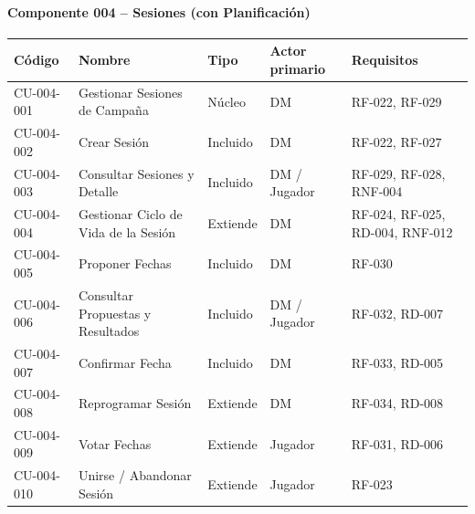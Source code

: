 \paragraph{Componente 004 -- Sesiones (con Planificación)}
{\footnotesize\setlength{\tabcolsep}{4pt}\renewcommand{\arraystretch}{1.15}
\begin{longtable}{|>{\raggedright\arraybackslash}p{1.9cm}|>{\raggedright\arraybackslash}p{4.4cm}|>{\raggedright\arraybackslash}p{1.7cm}|>{\raggedright\arraybackslash}p{2.5cm}|>{\raggedright\arraybackslash}p{4.0cm}|}
\hline
\textbf{Código} & \textbf{Nombre} & \textbf{Tipo} & \textbf{Actor primario} & \textbf{Requisitos} \\ \hline\endhead
CU-004-001 & Gestionar Sesiones de Campaña & Núcleo & DM & RF-022, RF-029 \\ \hline
CU-004-002 & Crear Sesión & Incluido & DM & RF-022, RF-027 \\ \hline
CU-004-003 & Consultar Sesiones y Detalle & Incluido & DM / Jugador & RF-029, RF-028, RNF-004 \\ \hline
CU-004-004 & Gestionar Ciclo de Vida de la Sesión & Extiende & DM & RF-024, RF-025, RD-004, RNF-012 \\ \hline
CU-004-005 & Proponer Fechas & Incluido & DM & RF-030 \\ \hline
CU-004-006 & Consultar Propuestas y Resultados & Incluido & DM / Jugador & RF-032, RD-007 \\ \hline
CU-004-007 & Confirmar Fecha & Incluido & DM & RF-033, RD-005 \\ \hline
CU-004-008 & Reprogramar Sesión & Extiende & DM & RF-034, RD-008 \\ \hline
CU-004-009 & Votar Fechas & Extiende & Jugador & RF-031, RD-006 \\ \hline
CU-004-010 & Unirse / Abandonar Sesión & Extiende & Jugador & RF-023 \\ \hline
\end{longtable}}
